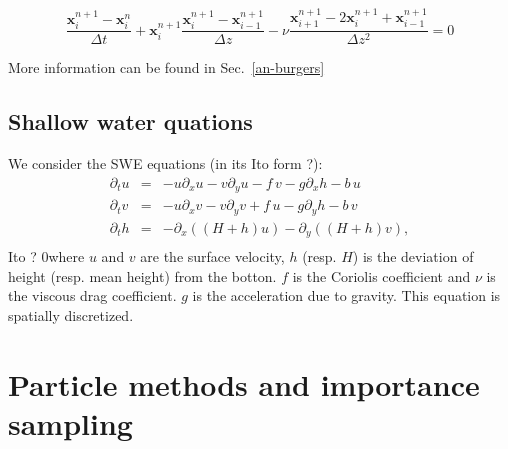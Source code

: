 \documentclass[aip,pof,nofootinbib,reprint,onecolumn]{revtex4-1}
\newcommand{\todo}[1]{{\color{red} #1 }}
\newcommand{\gras}[1]{\boldsymbol{#1}}
\newcommand{\mypar}[1]{\left(#1\right)}
\newcommand{\point}{\gras{x}} %
\begin{document}
\begin{equation}
 \frac{\point^{n+1}_i - \point^{n}_i}{\Delta t} + \point^{n+1}_i \frac{\point^{n+1}_i - \point^{n+1}_{i-1}}{\Delta z} - \nu \frac{\point^{n+1}_{i+1} -2 \point^{n+1}_i + \point^{n+1}_{i-1}}{\Delta z ^2} = 0 
\label{eq-fdyn_burgers}
\end{equation}

More information can be found in Sec.~\ref{an-burgers}


\subsection{Shallow water quations}  \label{ssec-swe}
\todo{We consider the \todo{SWE} equations (in its Ito form ?):
\begin{equation}
\begin{array}{lll}
\partial_t u & =& - u \partial_x u - v \partial_y u - f\,v - g \partial_x h -b\,u\\ 
\partial_t v & =& - u \partial_x v - v \partial_y v + f\,u - g \partial_y h -b\,v\\
\partial_t h & =& - \partial_x \mypar{\mypar{H+h}u} - \partial_y \mypar{\mypar{H+h}v}, \\
\end{array}
\label{eq-swe}
\end{equation} 
\todo{Ito ?} 0where $u$ and $v$ are the surface velocity, $h$ (resp. $H$) is the deviation of height (resp. mean height) from the botton. $f$ is the Coriolis coefficient and $\nu$ is the viscous drag coefficient. $g$ is the acceleration due to gravity.
This equation is spatially discretized.}


%
\section{Particle methods and importance sampling}
\label{sec-ipf}
\end{document}
